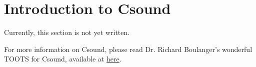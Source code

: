 \section{Introduction to Csound}

Currently, this section is not yet written.

For more information on Csound, please read Dr. Richard Boulanger's
wonderful TOOTS for Csound, available at
\href{http://csounds.com/toots/}{here}.
